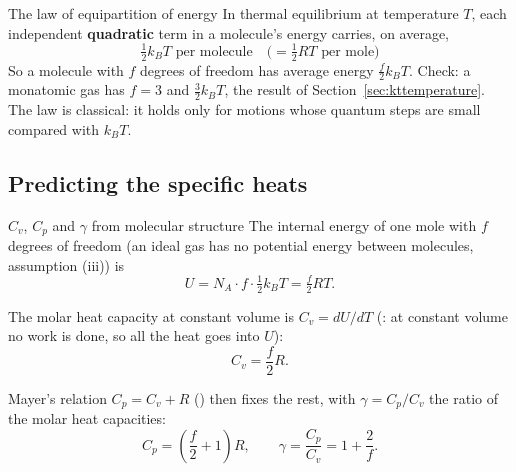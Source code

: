 \begin{keybox}{The law of equipartition of energy}
In thermal equilibrium at temperature $T$, each independent \textbf{quadratic} term in a molecule's
energy carries, on average,
\[
\boxed{\;\tfrac12 k_BT \text{ per molecule}\quad\bigl(=\tfrac12 RT \text{ per mole}\bigr)\;}
\]
So a molecule with $f$ degrees of freedom has average energy $\tfrac{f}{2}k_BT$. Check: a monatomic gas
has $f=3$ and $\tfrac32 k_BT$, the result of Section~\ref{sec:kttemperature}. The law is classical: it
holds only for motions whose quantum steps are small compared with $k_BT$.
\end{keybox}


\subsection{Predicting the specific heats}

\begin{derivbox}{$C_v$, $C_p$ and $\gamma$ from molecular structure}
 The internal energy of one mole with $f$ degrees of freedom (an ideal gas has no potential
energy between molecules, assumption (iii)) is
\[
U = N_A \cdot f\cdot\tfrac12 k_BT = \tfrac{f}{2}RT .
\]

 The molar heat capacity at constant volume is $C_v = dU/dT$ (: at constant
volume no work is done, so all the heat goes into $U$):
\[
C_v = \frac{f}{2}R .
\]

 Mayer's relation $C_p=C_v+R$ () then fixes the rest, with $\gamma=C_p/C_v$
the ratio of the molar heat capacities:
\[
C_p = \left(\frac{f}{2}+1\right)R,
\qquad
\gamma = \frac{C_p}{C_v} = 1 + \frac{2}{f}.
\]
\end{derivbox}

